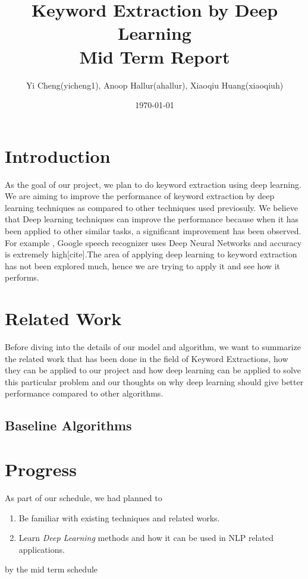 \documentclass[dvips,12pt]{article}
\begin{document}
	
	
	\title{Keyword Extraction by Deep Learning \\Mid Term Report}
	\author{Yi Cheng(yicheng1), Anoop Hallur(ahallur), Xiaoqiu Huang(xiaoqiuh)}
	\date{\today}
	
	
	\maketitle
	
	
	\section{Introduction}
		As the goal of our project, we plan to do keyword extraction using deep learning. We are aiming to improve the performance of keyword extraction by deep learning techniques as compared to other techniques used previosuly.
		We believe that Deep learning techniques can improve the performance because when it has been applied to other similar tasks, a significant improvement has been observed.
		For example , Google speech recognizer uses Deep Neural Networks and accuracy is extremely high[cite].The area of applying deep learning to keyword extraction has not been explored much, hence we are trying to apply it and see how it performs.
	\section{Related Work}
		Before diving into the details of our model and algorithm, we want to summarize the related work that has been done in the field of Keyword Extractions, how they can be applied to our project and how deep learning can be applied to solve this particular problem and our thoughts on why deep learning should give better performance compared to other algorithms.
		\subsection{Baseline Algorithms}
	\section{Progress}
		As part of our schedule, we had planned to 
		\begin{enumerate}
		\item Be familiar with existing techniques and related works.
		\item Learn \emph{Deep Learning} methods and how it can be used in NLP related applications.
		\end{enumerate} 
		by the mid term schedule
		
\end{document}
